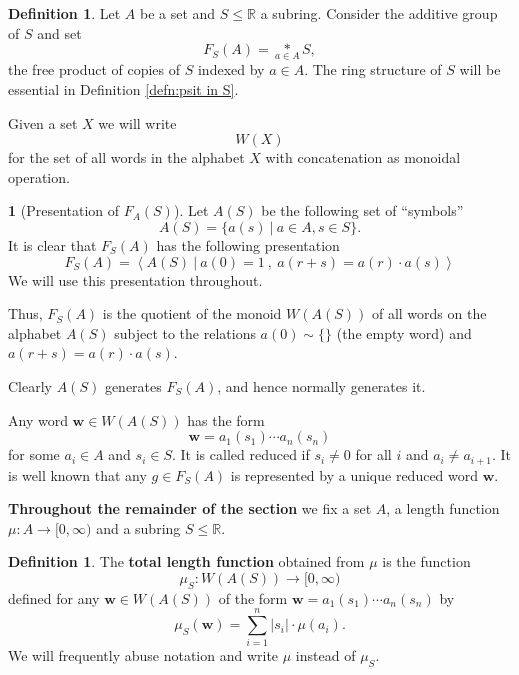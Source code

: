 \documentclass[12pt]{amsart}
\theoremstyle{definition}
\newtheorem{defn}[prop]{Definition}
\newtheorem{void}[prop]{}
\def\RR{\ensuremath{\mathbb{R}}}
\def\ZZ{\ensuremath{\mathbb{Z}}}
\newcommand{\B}[1]{\mathbf{#1}}
\def\Free{F}
\begin{document}
\begin{defn}\label{def:FSA}
Let $A$ be a set and $S \leq \RR$ a subring.
Consider the additive group of $S$ and set
\[
\Free_S(A) = \underset{{a \in A}}{*} S,
\]
the free product of copies of $S$ indexed by $a \in A$.
The ring structure of $S$ will be essential in Definition \ref{defn:psit in S}.
\end{defn}



Given a set $X$ we will write
\[
W(X)
\]
for the set of all words in the alphabet $X$ with concatenation as monoidal operation.




\begin{void}[Presentation of $\Free_A(S)$]\label{V:presentation FSA}
Let $A(S)$ be the following set of ``symbols''
\[
A(S) = \{a(s) \ | \ a \in A,  s \in S\}.
\]
It is clear that $\Free_S(A)$ has the following presentation
\begin{equation}\label{eqn:presentation of FSA}
\Free_S(A) = \left \langle A(S) \  \big| \ a(0) = 1 \ , \ a(r+s)=a(r)\cdot a(s) \right \rangle
\end{equation}
We will use this presentation throughout.

Thus, $\Free_S(A)$ is the quotient of the monoid $W(A(S))$ of all words on the alphabet $A(S)$ subject to the relations $a(0) \sim \{\}$ (the empty word) and $a(r+s)=a(r) \cdot a(s)$.

Clearly $A(S)$ generates $\Free_S(A)$, and hence normally generates it.

Any word $\B w \in W(A(S))$ has the form
\[
\B w = a_1(s_1) \cdots a_n(s_n)
\]
for some $a_i \in A$ and $s_i \in S$.
It is called reduced if $s_i \neq 0$ for all $i$ and $a_{i} \neq a_{i+1}$.
It is well known that any $g \in \Free_S(A)$ is represented by a unique reduced word $\B w$.

\end{void}


{\bf Throughout the remainder of the section} we fix a set $A$, a length function $\mu \colon A \to [0,\infty)$ and a subring $S \leq \RR$.




\begin{defn}\label{defn:total length function}
The {\bf total length function} obtained from $\mu$ is the function 
\[
\mu_S \colon W(A(S)) \to [0,\infty)
\]
defined for any $\B w \in W(A(S))$ of the form $\B w = a_1(s_1) \cdots a_n(s_n)$ by
\[
\mu_S (\B w) = \sum_{i=1}^n |s_i| \cdot \mu(a_i).
\]
We will frequently abuse notation and write $\mu$ instead of $\mu_S$.
\end{defn}
\end{document}
